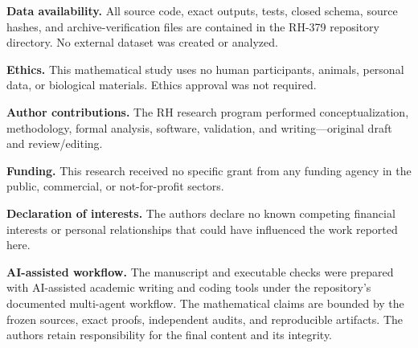 \documentclass[11pt]{article}
\theoremstyle{definition}
\theoremstyle{remark}
\begin{document}
\textbf{Data availability.}  All source code, exact outputs, tests, closed
schema, source hashes, and archive-verification files are contained in the
RH-379 repository directory.  No external dataset was created or analyzed.

\textbf{Ethics.}  This mathematical study uses no human participants,
animals, personal data, or biological materials.  Ethics approval was not
required.

\textbf{Author contributions.}  The RH research program performed
conceptualization, methodology, formal analysis, software, validation, and
writing---original draft and review/editing.

\textbf{Funding.}  This research received no specific grant from any
funding agency in the public, commercial, or not-for-profit sectors.

\textbf{Declaration of interests.}  The authors declare no known competing
financial interests or personal relationships that could have influenced
the work reported here.

\textbf{AI-assisted workflow.}  The manuscript and executable checks were
prepared with AI-assisted academic writing and coding tools under the
repository's documented multi-agent workflow.  The mathematical claims are
bounded by the frozen sources, exact proofs, independent audits, and
reproducible artifacts.  The authors retain responsibility for the final
content and its integrity.

\begingroup
\small


\endgroup
\end{document}
